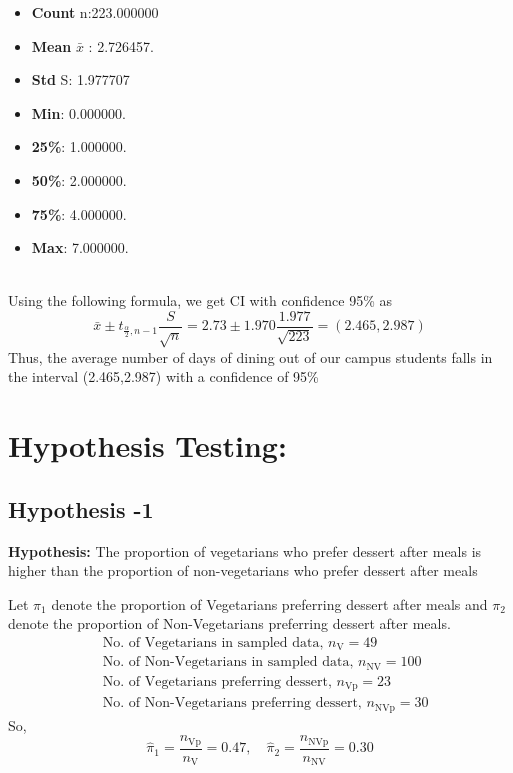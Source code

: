 \documentclass[12pt]{article}
\begin{document}
        \begin{itemize}
            \item \textbf{Count} n:223.000000
            \item \textbf{Mean} $\bar{x}$ : 2.726457.
            \item \textbf{Std} S: 1.977707
            \item \textbf{Min}: 0.000000.
            \item \textbf{25\%}: 1.000000.
            \item \textbf{50\%}: 2.000000.
            \item \textbf{75\%}: 4.000000.
            \item \textbf{Max}: 7.000000.
        \end{itemize}
    \\
    Using the following formula, we get CI with confidence 95\% as
        \begin{equation}
        \bar{x} \pm t_{\frac{\alpha}{2}, n-1} \frac{S}{\sqrt{n}} =
        2.73 \pm 1.970 \frac{1.977}{\sqrt{223}} = (2.465,2.987)
        \end{equation}
    Thus, the average number of days of dining out of our campus students falls in the interval (2.465,2.987) with a confidence of 95\%  

\section{Hypothesis Testing:}
    \subsection{Hypothesis -1}
       \textbf{Hypothesis:}
        The proportion of vegetarians who prefer dessert after meals is higher than the proportion of non-vegetarians who prefer dessert after meals
       \medskip
       
    Let $\pi_1$ denote the proportion of Vegetarians preferring dessert after meals and $\pi_2$ denote the proportion of Non-Vegetarians preferring dessert after meals.
    \begin{align}
        &\text{No. of Vegetarians in sampled data, } n_{\text{V}} = 49 \\
        &\text{No. of Non-Vegetarians in sampled data, } n_{\text{NV}} = 100 \\
        &\text{No. of Vegetarians preferring dessert, } n_{\text{Vp}} = 23 \\
        &\text{No. of Non-Vegetarians preferring dessert, } n_{\text{NVp}} = 30
    \end{align}
    So,
    \begin{equation}
        \hat{\pi}_1 = \frac{n_{\text{Vp}}}{n_{\text{V}}} = 0.47, \quad \hat{\pi}_2 = \frac{n_{\text{NVp}}}{n_{\text{NV}}} = 0.30
    \end{equation}
\end{document}
